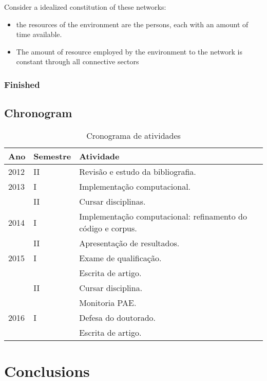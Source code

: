 \documentclass[a4paper,openright,12pt]{report} %
\begin{document}
Consider a idealized constitution of these networks: 
\begin{itemize}
	\item the resources of the environment are the persons, each with an amount of time available.
	\item The amount of resource employed by the environment to the network is constant through all connective sectors
\end{itemize}

\subsection{Finished}


\section{Chronogram}

\begin{center}
\begin{table}[ht]
\centering
\begin{tabular}{lll}
Ano & Semestre & Atividade \\
\hline
2012 & II & Revis\~ao e estudo da bibliografia.\\
\hline
2013 & I & Implementa\c c\~ao computacional.\\
\ & II & Cursar disciplinas.\\
\hline
2014 & I & Implementa\c c\~ao computacional: refinamento do c\'odigo e corpus.\\
\ & II & Apresenta\c c\~ao de resultados.\\
\hline
2015 & I & Exame de qualifica\c c\~ao.\\
\ & \ & Escrita de artigo.\\
\ & II & Cursar disciplina.\\
\ & \ & Monitoria PAE.\\
\hline
2016 & I & Defesa do doutorado.\\
\ & \ & Escrita de artigo.\\
\hline
\end{tabular}
\caption{Cronograma de atividades}
\label{table:cronograma}
\end{table}
\end{center}



\chapter{Conclusions}


\end{document}
